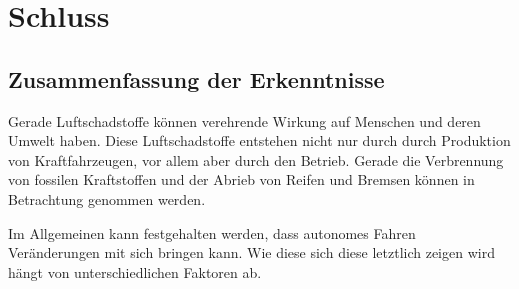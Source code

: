 \chapter{Schluss}
\section{Zusammenfassung der Erkenntnisse}
Gerade Luftschadstoffe können verehrende Wirkung auf Menschen und deren Umwelt haben.
Diese Luftschadstoffe entstehen nicht nur durch durch Produktion von Kraftfahrzeugen, vor allem aber durch den Betrieb.
Gerade die Verbrennung von fossilen Kraftstoffen und der Abrieb von Reifen und Bremsen können in Betrachtung genommen werden.

Im Allgemeinen kann festgehalten werden, dass autonomes Fahren Veränderungen mit sich bringen kann.
Wie diese sich diese letztlich zeigen wird hängt von unterschiedlichen Faktoren ab.
